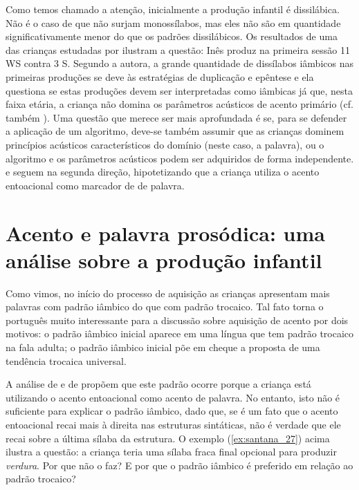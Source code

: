 \documentclass[output=paper]{LSP/langsci}
\begin{document}
Como temos chamado a atenção, inicialmente a produção infantil é dissilábica. Não é o caso de que não surjam monossílabos, mas eles não são em quantidade significativamente menor do que os padrões dissilábicos. Os resultados de uma das crianças estudadas por \citet{correia2009} ilustram a questão: Inês produz na primeira sessão 11 WS contra 3 S.  Segundo a autora, a grande quantidade de dissílabos iâmbicos nas primeiras produções se deve às estratégias de duplicação e epêntese e ela questiona se estas produções devem ser interpretadas como iâmbicas já que, nesta faixa etária, a criança não domina os parâmetros acústicos de acento primário (cf. também \citealt{gamarossi1999}). Uma questão que merece ser mais aprofundada é se, para se defender a aplicação de um algoritmo, deve-se também assumir que as crianças dominem princípios acústicos característicos do domínio (neste caso, a palavra), ou o algoritmo e os parâmetros acústicos podem ser adquiridos de forma independente. \citet{santos2001} e \citet{frotavigario2008} seguem na segunda direção, hipotetizando que a criança utiliza o acento entoacional como marcador de  de palavra.

\section{Acento e palavra prosódica: uma análise sobre a produção infantil}
\label{sec:santana_acento_pros_infantil}

Como vimos, no início do processo de aquisição as crianças apresentam mais palavras com padrão iâmbico do que com padrão trocaico. Tal fato torna o português muito interessante para a discussão sobre aquisição de acento por dois motivos: o padrão iâmbico inicial aparece em uma língua que tem padrão trocaico na fala adulta; o padrão iâmbico inicial põe em cheque a proposta de uma tendência trocaica universal.

A análise de \citet{santos2001} e de \citet{frotavigario2008} propõem que este padrão ocorre porque a criança está utilizando o acento entoacional como acento de palavra. No entanto, isto não é suficiente para explicar o padrão iâmbico, dado que, se é um fato que o acento entoacional recai mais à direita nas estruturas sintáticas, não é verdade que ele recai sobre a última sílaba da estrutura. O exemplo (\ref{ex:santana_27}) acima ilustra a questão: a criança teria uma sílaba fraca final opcional para produzir \textit{verdura}. Por que não o faz? E por que o padrão iâmbico é preferido em relação ao padrão trocaico?
\end{document}
